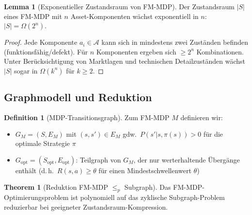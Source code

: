﻿\documentclass[a4paper,12pt]{article}
\theoremstyle{definition}
\newtheorem{definition}{Definition}[section]
\newtheorem{lemma}{Lemma}[section]
\newtheorem{theorem}{Theorem}[section]
\begin{document}
\begin{lemma}[Exponentieller Zustandsraum von FM-MDP]
\label{lem:mdp-exp}
Der Zustandsraum $|S|$ eines FM-MDP mit $n$ Asset-Komponenten wächst exponentiell in $n$:
$|S| = \Omega(2^n)$.
\end{lemma}

\begin{proof}
Jede Komponente $a_i \in \mathcal{A}$ kann sich in mindestens zwei Zuständen befinden
(funktionsfähig/defekt). Für $n$ Komponenten ergeben sich $\geq 2^n$ Kombinationen.
Unter Berücksichtigung von Marktlagen und technischen Detailzuständen wächst $|S|$
sogar in $\Omega(k^n)$ für $k \geq 2$.
\end{proof}

\subsection{Graphmodell und Reduktion}

\begin{definition}[MDP-Transitionsgraph]
\label{def:mdptg}
Zum FM-MDP $M$ definieren wir:
\begin{itemize}
    \item $G_M = (S, E_M)$ mit $(s, s') \in E_M$ gdw.\ $P(s' | s, \pi(s)) > 0$
          für die optimale Strategie $\pi$
    \item $G_{\mathrm{opt}} = (S_{\mathrm{opt}}, E_{\mathrm{opt}})$: Teilgraph von $G_M$,
          der nur werterhaltende Übergänge enthält
          (d.\,h.\ $R(s, a) \geq \theta$ für einen Mindestschwellenwert $\theta$)
\end{itemize}
\end{definition}

\begin{theorem}[Reduktion FM-MDP $\leq_p$ Subgraph]
\label{thm:mdp-red}
Das FM-MDP-Optimierungsproblem ist polynomiell auf das zyklische Subgraph-Problem
reduzierbar bei geeigneter Zustandsraum-Kompression.
\end{theorem}
\end{document}
